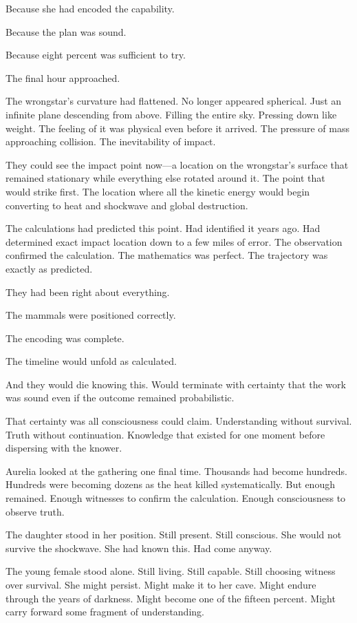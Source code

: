 Because she had encoded the capability.

Because the plan was sound.

Because eight percent was sufficient to try.

\scenebreak

The final hour approached.

The wrongstar's curvature had flattened. No longer appeared spherical. Just an infinite plane descending from above. Filling the entire sky. Pressing down like weight. The feeling of it was physical even before it arrived. The pressure of mass approaching collision. The inevitability of impact.

They could see the impact point now—a location on the wrongstar's surface that remained stationary while everything else rotated around it. The point that would strike first. The location where all the kinetic energy would begin converting to heat and shockwave and global destruction.

The calculations had predicted this point. Had identified it years ago. Had determined exact impact location down to a few miles of error. The observation confirmed the calculation. The mathematics was perfect. The trajectory was exactly as predicted.

They had been right about everything.

The mammals were positioned correctly.

The encoding was complete.

The timeline would unfold as calculated.

And they would die knowing this. Would terminate with certainty that the work was sound even if the outcome remained probabilistic.

That certainty was all consciousness could claim. Understanding without survival. Truth without continuation. Knowledge that existed for one moment before dispersing with the knower.

Aurelia looked at the gathering one final time. Thousands had become hundreds. Hundreds were becoming dozens as the heat killed systematically. But enough remained. Enough witnesses to confirm the calculation. Enough consciousness to observe truth.

The daughter stood in her position. Still present. Still conscious. She would not survive the shockwave. She had known this. Had come anyway.

The young female stood alone. Still living. Still capable. Still choosing witness over survival. She might persist. Might make it to her cave. Might endure through the years of darkness. Might become one of the fifteen percent. Might carry forward some fragment of understanding.

